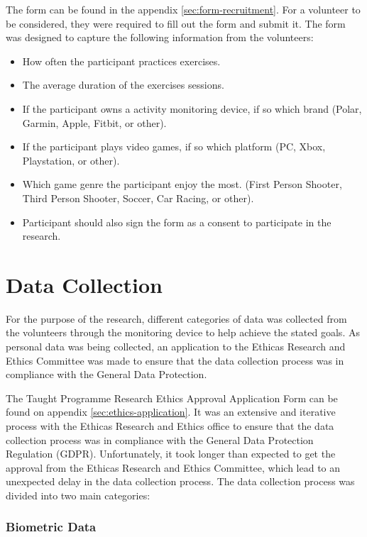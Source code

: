 The form can be found in the appendix \ref{sec:form-recruitment}.
For a volunteer to be considered, they were required to fill out the form and submit it. The form was designed to capture the following information from the volunteers:

\begin{itemize}
    \item How often the participant practices exercises.
    \item The average duration of the exercises sessions.
    \item If the participant owns a activity monitoring device, if so which brand (Polar, Garmin, Apple, Fitbit, or other).
    \item If the participant plays video games, if so which platform (PC, Xbox, Playstation, or other).
    \item Which game genre the participant enjoy the most. (First Person Shooter, Third Person Shooter, Soccer, Car Racing, or other).
    \item Participant should also sign the form as a consent to participate in the research.
\end{itemize}

\section{Data Collection}

For the purpose of the research, different categories of data was collected from the volunteers through the monitoring device to help achieve the stated goals. As personal data was
being collected, an application to the Ethicas Research and Ethics Committee was made to ensure that the data collection process was in compliance with the General Data Protection.

\par 
The Taught Programme Research Ethics Approval Application Form can be found on appendix \ref{sec:ethics-application}. It was an extensive and iterative process with the Ethicas Research and Ethics 
office to ensure that the data collection process was in compliance with the General Data Protection Regulation (GDPR). Unfortunately, it took longer than expected to get the approval
from the Ethicas Research and Ethics Committee, which lead to an unexpected delay in the data collection process. The data collection process was divided into two main categories:

\subsubsection*{Biometric Data}


